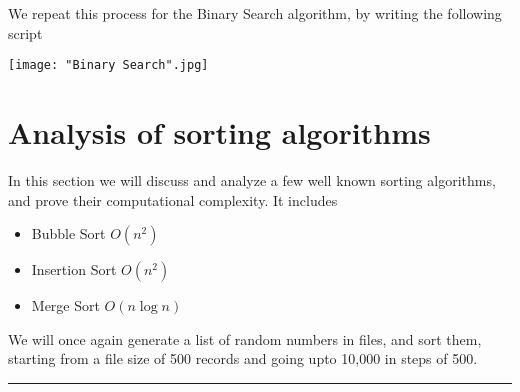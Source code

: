\documentclass[a4paper, 12pt]{article}
\begin{document}
	\begin{flushleft}
	We repeat this process for the Binary Search algorithm, by writing the following script
	\end{flushleft}
	
	\begin{center}
		\texttt{[image: "Binary Search".jpg]}
	\end{center}
	
	\section*{Analysis of sorting algorithms}
	In this section we will discuss and analyze a few well known sorting algorithms, and prove their computational complexity. It includes
	\begin{itemize}
		\item Bubble Sort $O(n^2)$
		\item Insertion Sort $O(n^2)$
		\item Merge Sort $O(n\log n)$
	\end{itemize}
	
	\begin{flushleft}
		We will once again generate a list of random numbers in files, and sort them, starting from a file size of 500 records and going upto 10,000 in steps of 500.
	\end{flushleft}
	
	\noindent\rule{\textwidth}{1pt}
	
\end{document}
